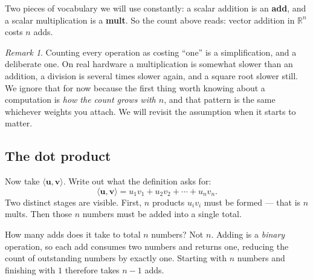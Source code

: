 \documentclass[11pt]{article}
\theoremstyle{plain}
\theoremstyle{definition}
\theoremstyle{remark}
\newtheorem*{rmk}{Remark}
\newcommand{\R}{\mathbb{R}}
\newcommand{\vc}[1]{\mathbf{#1}}
\begin{document}
\noindent Two pieces of vocabulary we will use constantly: a scalar addition is
an \textbf{add}, and a scalar multiplication is a \textbf{mult}. So the count
above reads: vector addition in $\R^{n}$ costs $n$ adds.

\begin{rmk}
Counting every operation as costing ``one'' is a simplification, and a
deliberate one. On real hardware a multiplication is somewhat slower than an
addition, a division is several times slower again, and a square root slower
still. We ignore that for now because the first thing worth knowing about a
computation is \emph{how the count grows with $n$}, and that pattern is the same
whichever weights you attach. We will revisit the assumption when it starts to
matter.
\end{rmk}

\subsection{The dot product}
Now take $\langle\vc{u},\vc{v}\rangle$. Write out what the definition asks for:
\[
  \langle\vc{u},\vc{v}\rangle
  = u_1v_1 + u_2v_2 + \cdots + u_nv_n .
\]
Two distinct stages are visible. First, $n$ products $u_iv_i$ must be formed ---
that is $n$ mults. Then those $n$ numbers must be added into a single total.

How many adds does it take to total $n$ numbers? Not $n$. Adding is a
\emph{binary} operation, so each add consumes two numbers and returns one,
reducing the count of outstanding numbers by exactly one. Starting with $n$
numbers and finishing with $1$ therefore takes $n-1$ adds.

\begin{center}
\end{center}
\end{document}
